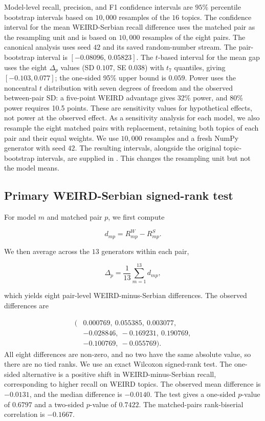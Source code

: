 \documentclass[11pt,a4paper]{article}
\begin{document}
Model-level recall, precision, and F1 confidence intervals are $95$\% percentile bootstrap intervals based on $10,000$ resamples of the $16$ topics. The confidence interval for the mean WEIRD-Serbian recall difference uses the matched pair as the resampling unit and is based on $10,000$ resamples of the eight pairs. The canonical analysis uses seed $42$ and its saved random-number stream. The pair-bootstrap interval is $[-0.08096,\,0.05823]$. The $t$-based interval for the mean gap uses the eight $\Delta_p$ values (SD $0.107$, SE $0.038$) with $t_{7}$ quantiles, giving $[-0.103, 0.077]$; the one-sided 95\% upper bound is $0.059$. Power uses the noncentral $t$ distribution with seven degrees of freedom and the observed between-pair SD: a five-point WEIRD advantage gives 32\% power, and 80\% power requires 10.5 points. These are sensitivity values for hypothetical effects, not power at the observed effect. As a sensitivity analysis for each model, we also resample the eight matched pairs with replacement, retaining both topics of each pair and their equal weights. We use $10{,}000$ resamples and a fresh NumPy generator with seed $42$. The resulting intervals, alongside the original topic-bootstrap intervals, are supplied in . This changes the resampling unit but not the model means.

\subsection{Primary WEIRD-Serbian signed-rank test}
\label{app:primary_wilcoxon}

For model $m$ and matched pair $p$, we first compute

\begin{equation}
 d_{mp}=R^W_{mp}-R^S_{mp}.
\end{equation}

We then average across the $13$ generators within each pair,

\begin{equation}
 \Delta_p=\frac{1}{13}\sum_{m=1}^{13} d_{mp},
\end{equation}

which yields eight pair-level WEIRD-minus-Serbian differences. The observed differences are

\[
\begin{aligned}
(&0.000769,\ 0.055385,\ 0.003077,\\
 &-0.028846,\ -0.169231,\ 0.190769,\\
 &-0.100769,\ -0.055769).
\end{aligned}
\]
All eight differences are non-zero, and no two have the same absolute value, so there are no tied ranks. We use an exact Wilcoxon signed-rank test. The one-sided alternative is a positive shift in WEIRD-minus-Serbian recall, corresponding to higher recall on WEIRD topics. The observed mean difference is $-0.0131$, and the median difference is $-0.0140$. The test gives a one-sided $p$-value of $0.6797$ and a two-sided $p$-value of $0.7422$. The matched-pairs rank-biserial correlation is $-0.1667$.
\end{document}
